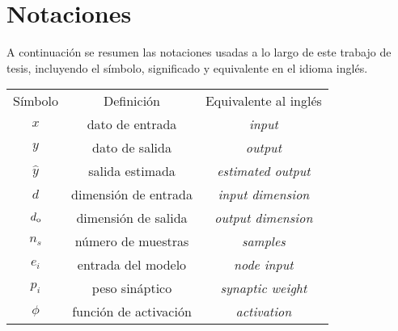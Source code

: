 \chapter{Notaciones}

A continuación se resumen las notaciones usadas a lo largo de este trabajo de tesis, incluyendo el símbolo,  significado y equivalente en el idioma inglés.


\begin{tabular} {c c c}
    Símbolo & Definición & Equivalente al inglés \\
    $x$ & dato de entrada & \emph{input} \\
    $y$ & dato de salida & \emph{output} \\
    $\hat{y}$ & salida estimada & \emph{estimated output} \\
    $d$ & dimensión de entrada & \emph{input dimension} \\
    $d_{\rm o}$ & dimensión de salida & \emph{output dimension} \\
    $n_s$ & número de muestras & \emph{samples} \\
    $e_i$ & entrada del modelo & \emph{node input} \\
    $p_i$ & peso sináptico & \emph{synaptic weight} \\
    $\phi$ & función de activación & \emph{activation} \\
\end{tabular}


